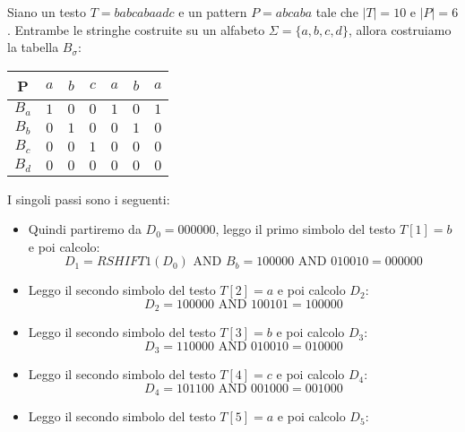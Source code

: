 \begin{esempio}
    Siano un testo $T = babcabaadc$ e un pattern $P = abcaba$ tale che $|T| = 10$
    e $|P|=6$. Entrambe le stringhe costruite su un alfabeto $\Sigma = \{a, b, c,
        d\}$, allora costruiamo la tabella $B_\sigma$:
    \begin{table}[!ht]
        \centering
        \begin{tabular}{|c|c|c|c|c|c|c|}
            \hline
            P     & $a$ & $b$ & $c$ & $a$ & $b$ & $a$ \\ \hline
            $B_a$ & $1$ & $0$ & $0$ & $1$ & $0$ & $1$ \\ \hline
            $B_b$ & $0$ & $1$ & $0$ & $0$ & $1$ & $0$ \\ \hline
            $B_c$ & $0$ & $0$ & $1$ & $0$ & $0$ & $0$ \\ \hline
            $B_d$ & $0$ & $0$ & $0$ & $0$ & $0$ & $0$ \\ \hline
        \end{tabular}
    \end{table}
    I singoli passi sono i seguenti:
    \begin{itemize}
        \item Quindi partiremo da $D_0 = 000000$, leggo il primo simbolo del
              testo $T[1] = b$ e poi calcolo:
              \begin{equation}
                  D_1=RSHIFT1(D_{0}) \text{ AND } B_b = 100000 \text{ AND }
                  010010 = 000000
              \end{equation}
        \item Leggo il secondo simbolo del testo $T[2] = a$ e poi calcolo $D_2$:
              \begin{equation}
                  D_2 = 100000 \text{ AND } 100101 = 100000
              \end{equation}
        \item Leggo il secondo simbolo del testo $T[3] = b$ e poi calcolo $D_3$:
              \begin{equation}
                  D_3 = 110000 \text{ AND } 010010 = 010000
              \end{equation}
        \item Leggo il secondo simbolo del testo $T[4] = c$ e poi calcolo $D_4$:
              \begin{equation}
                  D_4 = 101100 \text{ AND } 001000 = 001000
              \end{equation}
        \item Leggo il secondo simbolo del testo $T[5] = a$ e poi calcolo $D_5$:

\end{itemize}
\end{esempio}
